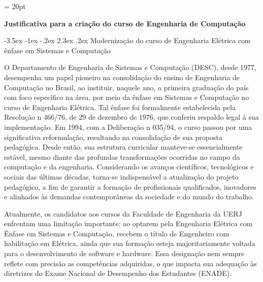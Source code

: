 \documentclass[12pt,a4paper]{article}
\makeatletter
\renewcommand{\section}{\@startsection{section}{1}{\z@}%
      {-3.5ex \@plus -1ex \@minus -.2ex}%
      {2.3ex \@plus.2ex}%
      {\normalfont\normalsize\bfseries}}
\makeatother
\begin{document}
\thispagestyle{firstpage} %
\headsep = 20pt
\setlength{\tabcolsep}{5pt} %
\vspace*{2.0cm}

\pagestyle{plain} %

\begin{center}
      \textbf{\large Justificativa para a criação do curso de Engenharia de Computação} \\
\end{center}
\small
\section{Modernização do curso de Engenharia Elétrica com ênfase em Sistemas e Computação}

O Departamento de Engenharia de Sistemas e Computação (DESC), desde 1977, desempenha um papel pioneiro na consolidação do ensino de Engenharia de Computação no Brasil, ao instituir, naquele ano, a primeira graduação do país com foco específico na área, por meio da ênfase em Sistemas e Computação no curso de Engenharia Elétrica. Tal ênfase foi formalmente estabelecida pela Resolução n\textordmasculine{} 466/76, de 29 de dezembro de 1976, que conferiu respaldo legal à sua implementação. Em 1994, com a Deliberação n\textordmasculine{} 035/94, o curso passou por uma significativa reformulação, resultando na consolidação de sua proposta pedagógica. Desde então, sua estrutura curricular manteve-se essencialmente estável, mesmo diante das profundas transformações ocorridas no campo da computação e da engenharia. Considerando os avanços científicos, tecnológicos e sociais das últimas décadas, torna-se indispensável a atualização do projeto pedagógico, a fim de garantir a formação de profissionais qualificados, inovadores e alinhados às demandas contemporâneas da sociedade e do mundo do trabalho.

Atualmente, os candidatos aos cursos da Faculdade de Engenharia da UERJ enfrentam uma limitação importante: ao optarem pela Engenharia Elétrica com Ênfase em Sistemas e Computação, recebem o título de Engenheiro com habilitação em Elétrica, ainda que sua formação esteja majoritariamente voltada para o desenvolvimento de software e hardware. Essa designação nem sempre reflete com precisão as competências adquiridas, o que impacta sua adequação às diretrizes do Exame Nacional de Desempenho dos Estudantes (ENADE).
\end{document}
